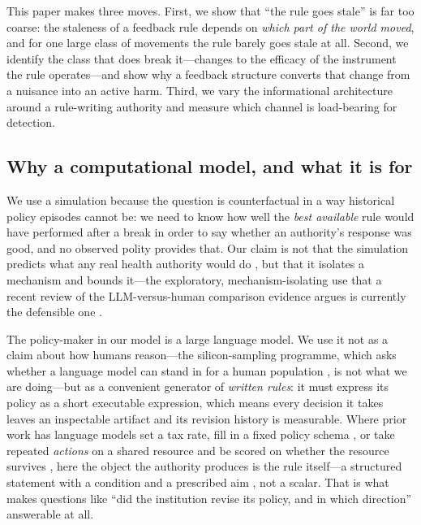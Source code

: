 \documentclass[11pt]{article}
\begin{document}
This paper makes three moves. First, we show that ``the rule goes stale'' is far too coarse: the
staleness of a feedback rule depends on \emph{which part of the world moved}, and for one large
class of movements the rule barely goes stale at all. Second, we identify the class that does break
it---changes to the efficacy of the instrument the rule operates---and show why a feedback structure
converts that change from a nuisance into an active harm. Third, we vary the informational
architecture around a rule-writing authority and measure which channel is load-bearing for
detection.

\subsection{Why a computational model, and what it is for}

We use a simulation because the question is counterfactual in a way historical policy episodes
cannot be: we need to know how well the \emph{best available} rule would have performed after a
break in order to say whether an authority's response was good, and no observed polity provides
that. Our claim is not that the simulation predicts what any real health authority would do
\citep[a claim that would require far more than statistical realism;][]{li2026statistical}, but that
it isolates a mechanism and bounds it---the exploratory, mechanism-isolating use that a recent review
of the LLM-versus-human comparison evidence argues is currently the defensible one
\citep{anthis2025position}.

The policy-maker in our model is a large language model. We use it not as a claim about how humans
reason---the silicon-sampling programme, which asks whether a language model can stand in for a human
population \citep{argyle2023out}, is not what we are doing---but as a convenient generator of
\emph{written rules}: it must express its policy as a short executable expression, which means every
decision it takes leaves an inspectable artifact and its revision history is measurable. Where prior
work has language models set a tax rate, fill in a fixed policy schema
\citep{wang2025taxagent,li2023econagent,decurto2026narratives}, or take repeated \emph{actions} on a
shared resource and be scored on whether the resource survives \citep{piatti2024govsim}, here the
object the authority produces is the rule itself---a structured statement with a condition and a
prescribed aim \citep{crawford1995grammar}, not a scalar. That is what makes questions like ``did the
institution revise its policy, and in which direction'' answerable at all.
\end{document}
